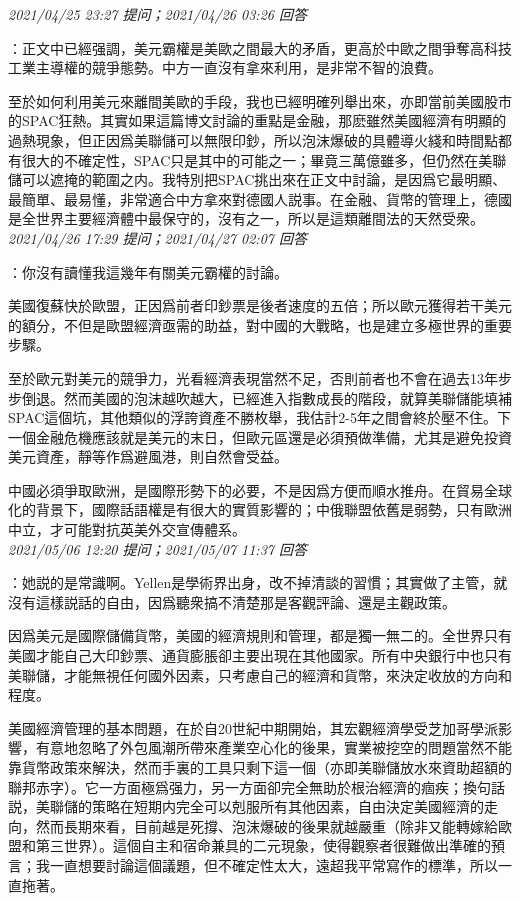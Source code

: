 \documentclass[twocolumn]{ctexart}
\begin{document}
\textit{\hfill\noindent\small 2021/04/25 23:27 提问；2021/04/26 03:26 回答}

：正文中已經强調，美元霸權是美歐之間最大的矛盾，更高於中歐之間爭奪高科技工業主導權的競爭態勢。中方一直沒有拿來利用，是非常不智的浪費。

至於如何利用美元來離間美歐的手段，我也已經明確列舉出來，亦即當前美國股市的SPAC狂熱。其實如果這篇博文討論的重點是金融，那麽雖然美國經濟有明顯的過熱現象，但正因爲美聯儲可以無限印鈔，所以泡沫爆破的具體導火綫和時間點都有很大的不確定性，SPAC只是其中的可能之一；畢竟三萬億雖多，但仍然在美聯儲可以遮掩的範圍之内。我特別把SPAC挑出來在正文中討論，是因爲它最明顯、最簡單、最易懂，非常適合中方拿來對德國人説事。在金融、貨幣的管理上，德國是全世界主要經濟體中最保守的，沒有之一，所以是這類離間法的天然受衆。
\\

\textit{\hfill\noindent\small 2021/04/26 17:29 提问；2021/04/27 02:07 回答}

：你沒有讀懂我這幾年有關美元霸權的討論。

美國復蘇快於歐盟，正因爲前者印鈔票是後者速度的五倍；所以歐元獲得若干美元的額分，不但是歐盟經濟亟需的助益，對中國的大戰略，也是建立多極世界的重要步驟。

至於歐元對美元的競爭力，光看經濟表現當然不足，否則前者也不會在過去13年步步倒退。然而美國的泡沫越吹越大，已經進入指數成長的階段，就算美聯儲能填補SPAC這個坑，其他類似的浮誇資產不勝枚舉，我估計2-5年之間會終於壓不住。下一個金融危機應該就是美元的末日，但歐元區還是必須預做準備，尤其是避免投資美元資產，靜等作爲避風港，則自然會受益。

中國必須爭取歐洲，是國際形勢下的必要，不是因爲方便而順水推舟。在貿易全球化的背景下，國際話語權是有很大的實質影響的；中俄聯盟依舊是弱勢，只有歐洲中立，才可能對抗英美外交宣傳體系。
\\

\textit{\hfill\noindent\small 2021/05/06 12:20 提问；2021/05/07 11:37 回答}

：她説的是常識啊。Yellen是學術界出身，改不掉清談的習慣；其實做了主管，就沒有這樣説話的自由，因爲聽衆搞不清楚那是客觀評論、還是主觀政策。

因爲美元是國際儲備貨幣，美國的經濟規則和管理，都是獨一無二的。全世界只有美國才能自己大印鈔票、通貨膨脹卻主要出現在其他國家。所有中央銀行中也只有美聯儲，才能無視任何國外因素，只考慮自己的經濟和貨幣，來決定收放的方向和程度。

美國經濟管理的基本問題，在於自20世紀中期開始，其宏觀經濟學受芝加哥學派影響，有意地忽略了外包風潮所帶來產業空心化的後果，實業被挖空的問題當然不能靠貨幣政策來解決，然而手裏的工具只剩下這一個（亦即美聯儲放水來資助超額的聯邦赤字）。它一方面極爲强力，另一方面卻完全無助於根治經濟的痼疾；換句話説，美聯儲的策略在短期内完全可以剋服所有其他因素，自由決定美國經濟的走向，然而長期來看，目前越是死撐、泡沫爆破的後果就越嚴重（除非又能轉嫁給歐盟和第三世界）。這個自主和宿命兼具的二元現象，使得觀察者很難做出準確的預言；我一直想要討論這個議題，但不確定性太大，遠超我平常寫作的標準，所以一直拖著。
\\
\end{document}
